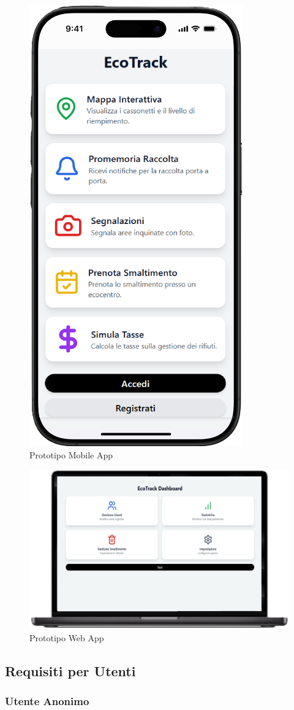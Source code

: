\begin{figure}[H]
    \centering
    \includegraphics[width=0.27\linewidth]{D1-G1//Img/MobileApp.PNG}
    \caption{Prototipo Mobile App}
    \label{fig:mobileapp}
\end{figure}

\begin{figure}[H]
    \centering
    \includegraphics[width=0.73\linewidth]{D1-G1//Img/WebApp.png}
    \caption{Prototipo Web App}
    \label{fig:webapp}
\end{figure}

\subsection{Requisiti per Utenti}
\subsubsection{Utente Anonimo}

